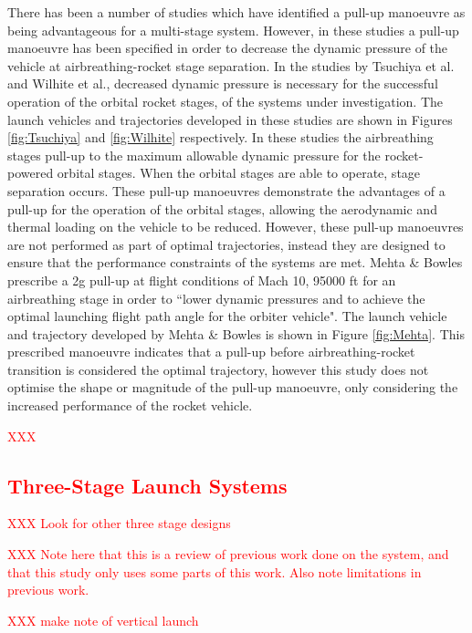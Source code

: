 There has been a number of studies which have identified a pull-up manoeuvre as being advantageous for a multi-stage system\cite{Tsuchiya2005,Wilhite1991,Mehta2001}. However, in these studies a pull-up manoeuvre has been specified in order to decrease the dynamic pressure of the vehicle at airbreathing-rocket stage separation. 
In the studies by Tsuchiya et al.\cite{Tsuchiya2005} and Wilhite et al.\cite{Wilhite1991}, decreased dynamic pressure is necessary for the successful operation of the orbital rocket stages, of the systems under investigation. The launch vehicles and trajectories developed in these studies are shown in Figures \ref{fig:Tsuchiya} and \ref{fig:Wilhite} respectively. In these studies the airbreathing stages pull-up to the maximum allowable dynamic pressure for the rocket-powered orbital stages. When the orbital stages are able to operate, stage separation occurs. These pull-up manoeuvres demonstrate the advantages of a pull-up for the operation of the orbital stages, allowing the aerodynamic and thermal loading on the vehicle to be reduced. However, these pull-up manoeuvres are not performed as part of optimal trajectories, instead they are designed to ensure that the performance constraints of the systems are met. 
Mehta \& Bowles\cite{Mehta2001} prescribe a 2g pull-up at flight conditions of Mach 10, 95000 ft for an airbreathing stage in order to ``lower dynamic pressures and to achieve the optimal launching flight path angle for the orbiter vehicle". The launch vehicle and trajectory developed by Mehta \& Bowles is shown in Figure \ref{fig:Mehta}. This prescribed manoeuvre indicates that a pull-up before airbreathing-rocket transition is considered the optimal trajectory, however this study does not optimise the shape or magnitude of the pull-up manoeuvre, only considering the increased performance of the rocket vehicle. 


  \textcolor{red}{XXX 
  \subsection{Three-Stage Launch Systems}
}
\textcolor{red}{XXX Look for other three stage designs}
	
\textcolor{red}{XXX Note here that this is a review of previous work done on the system, and that this study only uses some parts of this work. Also note limitations in previous work.}

\textcolor{red}{XXX make note of vertical launch}


